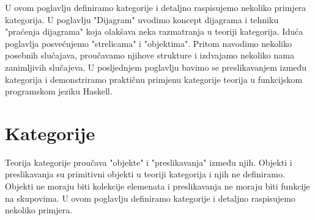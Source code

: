   U ovom poglavlju definiramo kategorije i detaljno raspisujemo nekoliko
  primjera kategorija. 
  U poglavlju "Dijagram" uvodimo koncept dijagrama i tehniku "praćenja
  dijagrama" koja olakšava neka razmatranja u teoriji kategorija.
  Iduća poglavlja posvećujemo  "strelicama" i "objektima". Pritom navodimo nekoliko
  posebnih slučajava, proučavamo njihove strukture i izdvajamo nekoliko nama
  zanimljivih slučajeva.
  U posljednjem poglavlju bavimo se preslikavanjem između kategorija i
  demonstriramo praktičnu primjenu kategorije teorija u funkcijskom programskom jeziku Haskell.

  \section{Kategorije}
  Teorija kategorije proučava "objekte" i "preslikavanja" između
  njih. Objekti i preslikavanja su primitivni objekti u teoriji kategorija i
  njih ne definiramo. Objekti ne moraju biti kolekcije elemenata i
  preslikavanja ne moraju biti funkcije na skupovima.
  U ovom poglavlju definiramo kategorije i detaljno raspisujemo nekoliko
  primjera.
